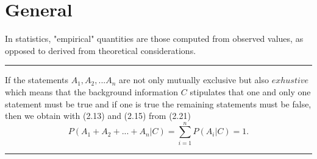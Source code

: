 \documentclass{article}
\begin{document}
\section{General}

In statistics, "empirical" quantities are those computed from observed values, as opposed to derived from theoretical considerations.

\hrule 

\cite{koch2010introduction}If the statements $A_1,A_2,...A_n$ are not only mutually exclusive but also $exhustive$ which means that the background information $C$ stipulates that one and only one statement must be true and if one is true the remaining statements must be false, then we obtain with (2.13) and (2.15) from (2.21)
\begin{equation}\label{eq:exhustive}
P(A_1 + A_2 + ... + A_n | C) = \sum_{i=1}^{n}P(A_i|C) = 1.
\end{equation}

\hrule





\end{document}
